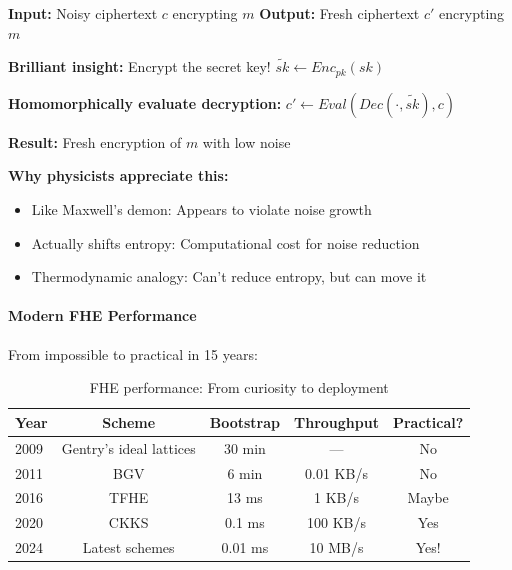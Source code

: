 \documentclass[11pt,a4paper]{article}
\begin{document}
\begin{algorithm}
\caption{Bootstrapping: The FHE Miracle}
\label{alg:bootstrap}
\begin{algorithmic}[1]
\State \textbf{Input:} Noisy ciphertext $c$ encrypting $m$
\State \textbf{Output:} Fresh ciphertext $c'$ encrypting $m$

\State \textbf{Brilliant insight:} Encrypt the secret key!
\State $\tilde{sk} \leftarrow Enc_{pk}(sk)$ 

\State \textbf{Homomorphically evaluate decryption:}
\State $c' \leftarrow Eval(Dec(\cdot, \tilde{sk}), c)$
\State {}

\State \textbf{Result:} Fresh encryption of $m$ with low noise
\end{algorithmic}
\end{algorithm}

\textbf{Why physicists appreciate this:}
\begin{itemize}
    \item Like Maxwell's demon: Appears to violate noise growth
    \item Actually shifts entropy: Computational cost for noise reduction
    \item Thermodynamic analogy: Can't reduce entropy, but can move it
\end{itemize}

\paragraph{Modern FHE Performance}

From impossible to practical in 15 years:

\begin{table}[h]
\centering
\begin{tabular}{|l|c|c|c|c|}
\hline
\textbf{Year} & \textbf{Scheme} & \textbf{Bootstrap} & \textbf{Throughput} & \textbf{Practical?} \\
\hline
2009 & Gentry's ideal lattices & 30 min & — & No \\
2011 & BGV & 6 min & 0.01 KB/s & No \\
2016 & TFHE & 13 ms & 1 KB/s & Maybe \\
2020 & CKKS & 0.1 ms & 100 KB/s & Yes \\
2024 & Latest schemes & 0.01 ms & 10 MB/s & Yes! \\
\hline
\end{tabular}
\caption{FHE performance: From curiosity to deployment}
\end{table}
\end{document}
